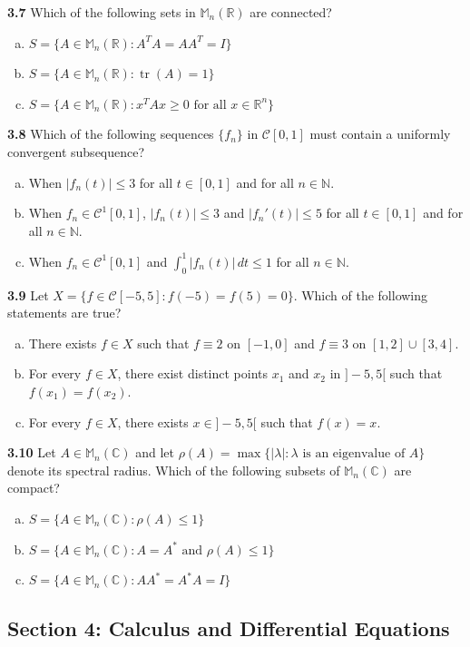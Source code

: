 \documentclass[11pt,a4paper]{article}
\newcommand{\N}{\mathbb{N}}
\newcommand{\R}{\mathbb{R}}
\newcommand{\C}{\mathbb{C}}
\newcommand{\M}{\mathbb{M}}
\newcommand{\tr}{\operatorname{tr}}
\newcommand{\examsec}[1]{%
  \subsection*{#1}
  \vspace{-2pt}
}
\newcommand{\qitem}[1]{\par\medskip\noindent\textbf{#1}\hspace{0.5em}}
\begin{document}
\qitem{3.7} Which of the following sets in $\M_n(\R)$ are connected?
\begin{enumerate}[a.]
  \item $S = \{A \in \M_n(\R) : A^T A = AA^T = I\}$
  \item $S = \{A \in \M_n(\R) : \tr(A) = 1\}$
  \item $S = \{A \in \M_n(\R) : x^T A x \ge 0 \text{ for all } x \in \R^n\}$
\end{enumerate}

\qitem{3.8} Which of the following sequences $\{f_n\}$ in $\mathcal{C}[0, 1]$ must contain a uniformly convergent subsequence?
\begin{enumerate}[a.]
  \item When $|f_n(t)| \le 3$ for all $t \in [0, 1]$ and for all $n \in \N$.
  \item When $f_n \in \mathcal{C}^1[0, 1]$, $|f_n(t)| \le 3$ and $|f_n'(t)| \le 5$ for all $t \in [0, 1]$ and for all $n \in \N$.
  \item When $f_n \in \mathcal{C}^1[0, 1]$ and $\int_0^1 |f_n(t)|\,dt \le 1$ for all $n \in \N$.
\end{enumerate}

\qitem{3.9} Let $X = \{f \in \mathcal{C}[-5, 5] : f(-5) = f(5) = 0\}$. Which of the following statements are true?
\begin{enumerate}[a.]
  \item There exists $f \in X$ such that $f \equiv 2$ on $[-1, 0]$ and $f \equiv 3$ on $[1, 2] \cup [3, 4]$.
  \item For every $f \in X$, there exist distinct points $x_1$ and $x_2$ in $]-5, 5[$ such that $f(x_1) = f(x_2)$.
  \item For every $f \in X$, there exists $x \in ]-5, 5[$ such that $f(x) = x$.
\end{enumerate}

\qitem{3.10} Let $A \in \M_n(\C)$ and let $\rho(A) = \max\{|\lambda| : \lambda \text{ is an eigenvalue of } A\}$ denote its spectral radius. Which of the following subsets of $\M_n(\C)$ are compact?
\begin{enumerate}[a.]
  \item $S = \{A \in \M_n(\C) : \rho(A) \le 1\}$
  \item $S = \{A \in \M_n(\C) : A = A^* \text{ and } \rho(A) \le 1\}$
  \item $S = \{A \in \M_n(\C) : AA^* = A^* A = I\}$
\end{enumerate}

\examsec{Section 4: Calculus and Differential Equations}
\end{document}
